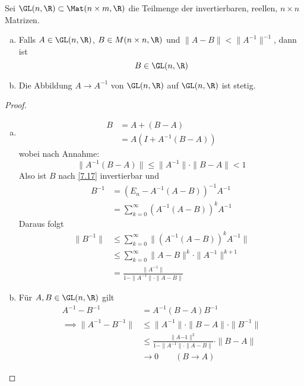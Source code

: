 \documentclass[a4paper,10pt]{scrbook}
\begin{document}
\begin{st}
\label{14.2}
Sei $\GL(n,\R)\subset \Mat(n\times m,\R)$ die Teilmenge der invertierbaren, reellen, $n\times n$ Matrizen.
\begin{enumerate}[a)]
\item Falls $A\in \GL(n,\R)$, $B\in M(n\times n,\R)$ und $\|A-B\|<\|A^{-1}\|^{-1}$, dann ist
\[
	B\in \GL(n,\R)
\]
\item Die Abbildung $A\to A^{-1}$ von $\GL(n,\R)$ auf $\GL(n,\R)$ ist stetig.
\end{enumerate}
\begin{proof}
\begin{enumerate}[a)]
\item
\begin{align*}
B &= A+(B-A)\\
&= A(I + A^{-1}(B-A))
\end{align*}
wobei nach Annahme:
\[
\|A^{-1}(B-A)\| \le \|A^{-1}\|\cdot \|B-A\|<1
\]
Also ist $B$ nach \ref{7.17} invertierbar und
\begin{align*}
B^{-1}&= (E_n-A^{-1}(A-B))^{-1}A^{-1}\\
&=\sum_{k=0}^\infty (A^{-1}(A-B))^k A^{-1}
\end{align*}
Daraus folgt
\begin{align*}
\|B^{-1}\| &\le \sum_{k=0}^\infty \| (A^{-1}(A-B))^{k}A^{-1}\|\\
&\le \sum_{k=0}^\infty \|A-B\|^k\cdot \|A^{-1}\|^{k+1}\\
&= \frac {\|A^{-1}\|}{1-\|A^{-1}\|\cdot \|A-B\|}
\end{align*}

\item
Für $A,B\in \GL(n,\R)$ gilt
\begin{align*}
A^{-1}-B^{-1} &= A^{-1}(B-A)B^{-1}\\
\implies \|A^{-1}-B^{-1}\| &\le\|A^{-1}\|\cdot\|B-A\|\cdot \|B^{-1}\|\\
&\le \frac{\|A{-1}\|^2}{1-\|A^{-1}\|\cdot\|A-B\|}\cdot \|B-A\|\\
&\to 0 \qquad (B\to A)
\end{align*}
\end{enumerate}
\end{proof}
\end{st}
\end{document}
